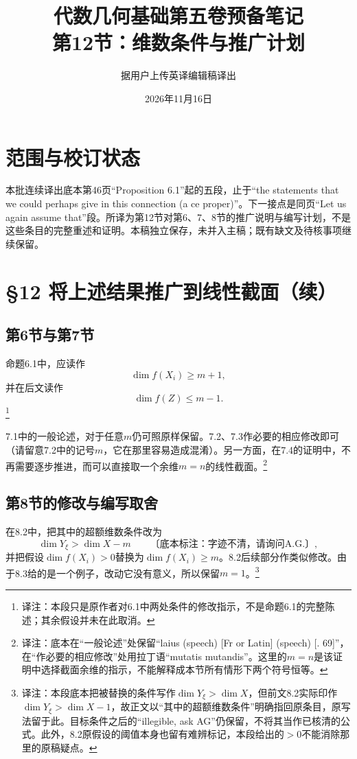 \documentclass[openany,fontset=fandol]{ctexbook}
\newcommand{\note}[1]{\footnote{译注：#1}}
\begin{document}
\title{代数几何基础第五卷预备笔记\\第12节：维数条件与推广计划}
\author{据用户上传英译编辑稿译出}
\date{2026年11月16日}
\maketitle
\chapter*{范围与校订状态}
本批连续译出底本第46页“Proposition 6.1”起的五段，止于“the statements that we could perhaps give in this connection (a ce proper)”。下一接点是同页“Let us again assume that”段。所译为第12节对第6、7、8节的推广说明与编写计划，不是这些条目的完整重述和证明。本稿独立保存，未并入主稿；既有缺文及待核事项继续保留。
\chapter*{§12 将上述结果推广到线性截面（续）}
\section*{第6节与第7节}
命题6.1中，应读作
\[
\dim f(X_i)\geq m+1,
\]
并在后文读作
\[
\dim f(Z)\leq m-1.
\]
\note{本段只是原作者对6.1中两处条件的修改指示，不是命题6.1的完整陈述；其余假设并未在此取消。}

7.1中的一般论述，对于任意$m$仍可照原样保留。7.2、7.3作必要的相应修改即可（请留意7.2中的记号$m$，它在那里容易造成混淆）。另一方面，在7.4的证明中，不再需要逐步推进，而可以直接取一个余维$m=n$的线性截面。\note{底本在“一般论述”处保留“laius (speech) [Fr or Latin] (speech) [. 69]”，在“作必要的相应修改”处用拉丁语“mutatis mutandis”。这里的$m=n$是该证明中选择截面余维的指示，不能解释成本节所有情形下两个符号恒等。}

\newpage
\section*{第8节的修改与编写取舍}
在8.2中，把其中的超额维数条件改为
\[
\dim Y_\xi>\dim X-m
\qquad\text{〔底本标注：字迹不清，请询问A.G.〕},
\]
并把假设$\dim f(X_i)>0$替换为$\dim f(X_i)\geq m$。8.2后续部分作类似修改。由于8.3给的是一个例子，改动它没有意义，所以保留$m=1$。\note{本段底本把被替换的条件写作$\dim Y_\xi>\dim X$，但前文8.2实际印作$\dim Y_\xi>\dim X-1$，故正文以“其中的超额维数条件”明确指回原条目，原写法留于此。目标条件之后的“illegible, ask AG”仍保留，不将其当作已核清的公式。此外，8.2原假设的阈值本身也留有难辨标记，本段给出的$>0$不能消除那里的原稿疑点。}
\end{document}
